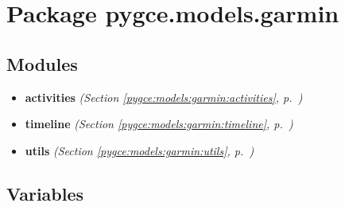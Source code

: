 %
%
%


\section{Package pygce.models.garmin}

    \label{pygce:models:garmin}


\subsection{Modules}

\begin{itemize}
\setlength{\parskip}{0ex}
\item \textbf{activities}
  \textit{(Section \ref{pygce:models:garmin:activities}, p.~\pageref{pygce:models:garmin:activities})}

\item \textbf{timeline}
  \textit{(Section \ref{pygce:models:garmin:timeline}, p.~\pageref{pygce:models:garmin:timeline})}

\item \textbf{utils}
  \textit{(Section \ref{pygce:models:garmin:utils}, p.~\pageref{pygce:models:garmin:utils})}

\end{itemize}



  \subsection{Variables}

